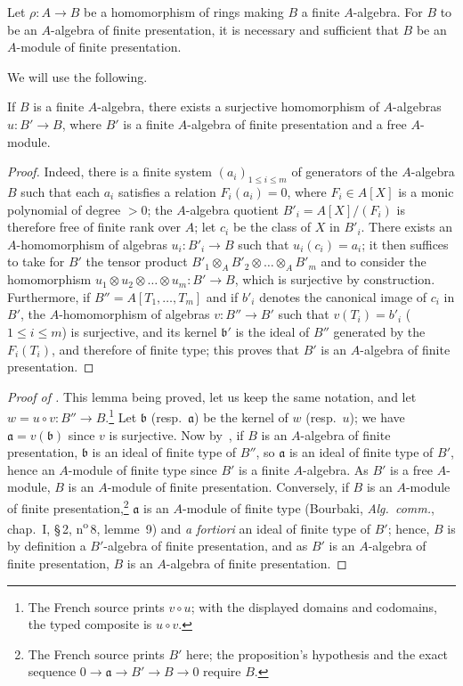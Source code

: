 \begin{proposition}[1.4.7]
\label{IV.1.4.7}
Let $\rho:A\to B$ be a homomorphism of rings making $B$ a finite $A$-algebra.
For $B$ to be an $A$-algebra of finite presentation, it is necessary and sufficient that $B$ be an $A$-module of finite presentation.
\end{proposition}

We will use the following.

\begin{lemma}[1.4.7.1]
\label{IV.1.4.7.1}
If $B$ is a finite $A$-algebra, there exists a surjective homomorphism of $A$-algebras $u:B'\to B$, where $B'$ is a finite $A$-algebra of finite presentation and a free $A$-module.
\end{lemma}

\begin{proof}
Indeed, there is a finite system $(a_i)_{1\leq i\leq m}$ of generators of the $A$-algebra $B$ such that each $a_i$ satisfies a relation $F_i(a_i)=0$, where $F_i\in A[X]$ is a monic polynomial of degree $>0$; the $A$-algebra quotient $B'_i=A[X]/(F_i)$ is therefore free of finite rank over $A$; let $c_i$ be the class of $X$ in $B'_i$.
There exists an $A$-homomorphism of algebras $u_i:B'_i\to B$ such that $u_i(c_i)=a_i$; it then suffices to take for $B'$ the tensor product $B'_1\otimes_A B'_2\otimes\ldots\otimes_A B'_m$ and to consider the homomorphism $u_1\otimes u_2\otimes\ldots\otimes u_m:B'\to B$, which is surjective by construction.
Furthermore, if $B''=A[T_1,\ldots,T_m]$ and if $b'_i$ denotes the canonical image of $c_i$ in $B'$, the $A$-homomorphism of algebras $v:B''\to B'$ such that $v(T_i)=b'_i$ ($1\leq i\leq m$) is surjective, and its kernel $\mathfrak{b}'$ is the ideal of $B''$ generated by the $F_i(T_i)$, and therefore of finite type; this proves that $B'$ is an $A$-algebra of finite presentation.
\end{proof}

\begin{proof}[Proof of {\rm{}}]
This lemma being proved, let us keep the same notation, and let $w=u\circ v:B''\to B$.\footnote{The French source prints $v\circ u$; with the displayed domains and codomains, the typed composite is $u\circ v$.}
Let $\mathfrak{b}$ (resp.~$\mathfrak{a}$) be the kernel of $w$ (resp.~$u$); we have $\mathfrak{a}=v(\mathfrak{b})$ since $v$ is surjective.
Now by~, if $B$ is an $A$-algebra of finite presentation, $\mathfrak{b}$ is an ideal of finite type of $B''$, so $\mathfrak{a}$ is an ideal of finite type of $B'$, hence an $A$-module of finite type since $B'$ is a finite $A$-algebra.
As $B'$ is a free $A$-module, $B$ is an $A$-module of finite presentation.
Conversely, if $B$ is an $A$-module of finite presentation,\footnote{The French source prints $B'$ here; the proposition's hypothesis and the exact sequence $0\to\mathfrak a\to B'\to B\to0$ require $B$.} $\mathfrak{a}$ is an $A$-module of finite type (Bourbaki, \emph{Alg.~comm.}, chap.~I, \S\,2, n\textsuperscript{o}\,8, lemme~9) and \emph{a fortiori} an ideal of finite type of $B'$; hence, $B$ is by definition a $B'$-algebra of finite presentation, and as $B'$ is an $A$-algebra of finite presentation, $B$ is an $A$-algebra of finite presentation.
\end{proof}


